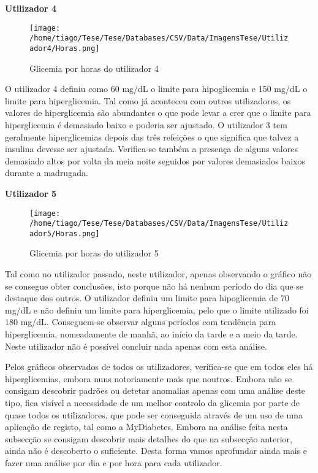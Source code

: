\textbf{Utilizador 4}

\begin{figure}[H]
\centering
\texttt{[image: /home/tiago/Tese/Tese/Databases/CSV/Data/ImagensTese/Utilizador4/Horas.png]}
\caption{Glicemia por horas do utilizador 4}
\end{figure}

O utilizador 4 definiu como 60 mg/dL o limite para hipoglicemia e 150 mg/dL o limite para hiperglicemia. Tal como já aconteceu com outros utilizadores, os valores de hiperglicemia são abundantes o que pode levar a crer que o limite para hiperglicemia é demasiado baixo e poderia ser ajustado. O utilizador 3 tem geralmente hiperglicemias depois das três refeições o que significa que talvez a insulina devesse ser ajustada. Verifica-se também a presença de alguns valores demasiado altos por volta da meia noite seguidos por valores demasiados baixos durante a madrugada. 


\textbf{Utilizador 5}

\begin{figure}[H]
\centering
\texttt{[image: /home/tiago/Tese/Tese/Databases/CSV/Data/ImagensTese/Utilizador5/Horas.png]}
\caption{Glicemia por horas do utilizador 5}
\end{figure}


Tal como no utilizador passado, neste utilizador, apenas observando o gráfico não se consegue obter conclusões, isto porque não há nenhum período do dia que se destaque dos outros. O utilizador definiu um limite para hipoglicemia de 70 mg/dL e não definiu um limite para hiperglicemia, pelo que o limite utilizado foi 180 mg/dL. Conseguem-se observar alguns períodos com tendência para hiperglicemia, nomeadamente de manhã, ao início da tarde e a meio da tarde. Neste utilizador não é possível concluir nada apenas com esta análise.\newline

Pelos gráficos observados de todos os utilizadores, verifica-se que em todos eles há hiperglicemias, embora nuns notoriamente mais que noutros. Embora não se consigam descobrir padrões ou detetar anomalias apenas com uma análise deste tipo, fica visível a necessidade de um melhor controlo da glicemia por parte de quase todos os utilizadores, que pode ser conseguida através de um uso de uma aplicação de registo, tal como a MyDiabetes. Embora na análise feita nesta subsecção se consigam descobrir mais detalhes do que na subsecção anterior, ainda não é descoberto o suficiente. Desta forma vamos aprofundar ainda mais e fazer uma análise por dia e por hora para cada utilizador.

